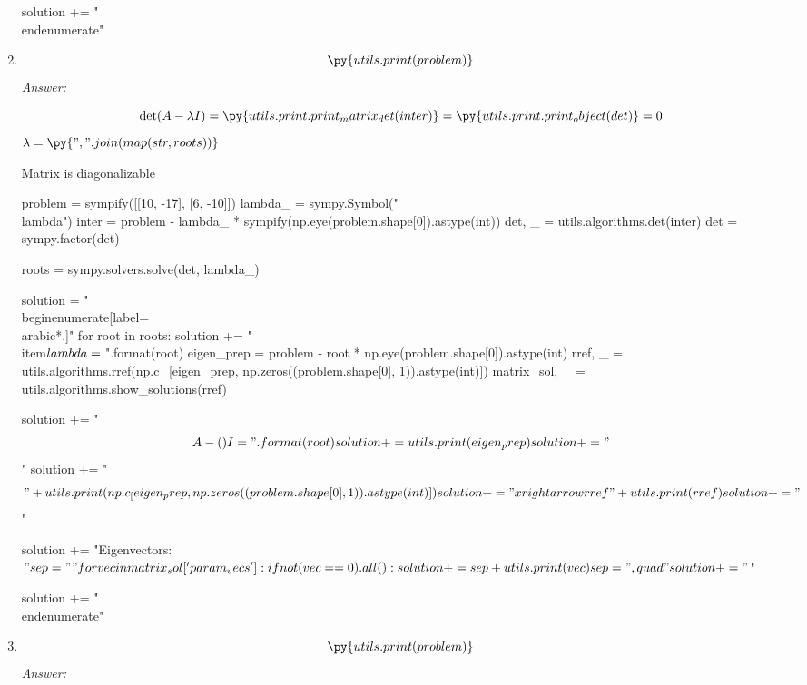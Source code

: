 \documentclass[letterpaper]{article}
\newcommand{\ans}{\textit{Answer: }}
\newenvironment{question}[2][Question]{\begin{trivlist}
\item[\hskip \labelsep {\bfseries #1}\hskip \labelsep {\bfseries #2.}]}{\end{trivlist}}
\newcommand{\printobj}[1]{\py{utils.print.print_object(#1)}}
\begin{document}
\begin{question}{5.5}
\begin{enumerate}[label=\textbf{(\alph*)}]
\begin{pycode}
solution += "\\end{enumerate}"

    \end{pycode}

    \item $$\py{utils.print(problem)}$$
    \ans

    $$\det(A - \lambda I) = \py{utils.print.print_matrix_det(inter)} = \printobj{det} = 0$$
    $\lambda = \py{", ".join(map(str, roots))}$


    Matrix is diagonalizable
    \begin{pycode}
problem = sympify([[10, -17], [6, -10]])
lambda_ = sympy.Symbol("\\lambda")
inter = problem - lambda_ * sympify(np.eye(problem.shape[0]).astype(int))
det, _ = utils.algorithms.det(inter)
det = sympy.factor(det)

roots = sympy.solvers.solve(det, lambda_)

solution = "\\begin{enumerate}[label=\\arabic*.]\n"
for root in roots:
  solution += "\\item$\\lambda = {}$\n".format(root)
  eigen_prep = problem - root * np.eye(problem.shape[0]).astype(int)
  rref, _ = utils.algorithms.rref(np.c_[eigen_prep, np.zeros((problem.shape[0], 1)).astype(int)])
  matrix_sol, _ = utils.algorithms.show_solutions(rref)

  solution += "$$A - ({}) I = ".format(root)
  solution += utils.print(eigen_prep)
  solution += "$$\n"
  solution += "$$" + utils.print(np.c_[eigen_prep, np.zeros((problem.shape[0], 1)).astype(int)])
  solution += "\\xrightarrow{rref}" + utils.print(rref)
  solution += "$$\n"

  solution += "Eigenvectors: $"

  sep = ""
  for vec in matrix_sol['param_vecs']:
    if not (vec == 0).all():
      solution += sep + utils.print(vec)
      sep = ",\\quad"

  solution += "$\n"

solution += "\\end{enumerate}"

    \end{pycode}

    \item $$\py{utils.print(problem)}$$
    \ans


\end{enumerate}
\end{question}
\end{document}

